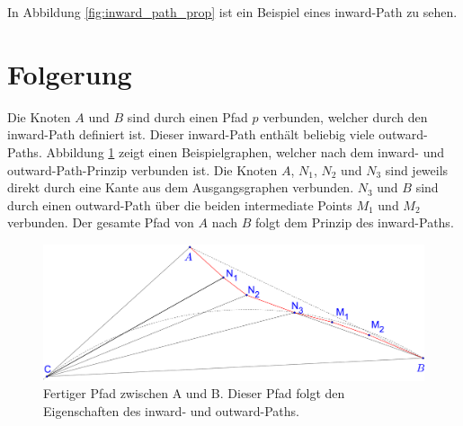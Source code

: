 \documentclass[a4paper,twoside]{IEEEtran}
\begin{document}
In Abbildung \ref{fig:inward_path_prop} ist ein Beispiel eines inward-Path zu sehen.

\section{Folgerung}
Die Knoten $A $ und $B $ sind durch einen Pfad $p $ verbunden, welcher durch den inward-Path definiert ist.
Dieser inward-Path enthält beliebig viele outward-Paths.
Abbildung \ref{fig:complete} zeigt einen Beispielgraphen, welcher nach dem inward- und outward-Path-Prinzip verbunden ist.
Die Knoten $A $, $N_1 $, $N_2 $ und $N_3 $ sind jeweils direkt durch eine Kante aus dem Ausgangsgraphen verbunden.
$N_3 $ und $B $ sind durch einen outward-Path über die beiden intermediate Points $M_1 $ und $M_2 $ verbunden.
Der gesamte Pfad von $A $ nach $B $ folgt dem Prinzip des inward-Paths.

\begin{figure}[h!]
\centering
\includegraphics[width=1.0\linewidth]{complete_path.eps}
\caption{Fertiger Pfad zwischen A und B. Dieser Pfad folgt den Eigenschaften des inward- und outward-Paths.}
\label{fig:complete}
\end{figure}
\end{document}
